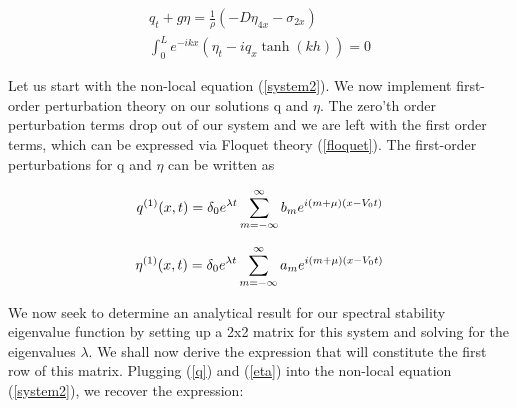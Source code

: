 \documentclass{article}
\begin{document}
\begin{align} \label{system}
q_{t} + g\eta = \frac{1}{\rho}( -D\eta_{4x} - \sigma_{2x} )\\\label{system2}
\int_{0}^{L} e^{-ikx}(\eta_{t} - iq_{x}\tanh(kh)) = 0
\end{align}


Let us start with the non-local equation (\ref{system2}). We now implement first-order perturbation theory on our solutions q and \(\eta\). The zero'th order perturbation terms drop out of our system and we are left with the first order terms, which can be expressed via Floquet theory (\ref{floquet}). The first-order perturbations for q and \(\eta\) can be written as

\begin{equation} \label{q}
  q^{(1)}(x,t) = \delta_{0}e^{\lambda t}\sum_{m=-\infty}^{\infty}b_{m}e^{i(m+\mu)(x-V_{0}t)}
\\
\end{equation}


\begin{equation} \label{eta}
  \eta^{(1)}(x,t) = \delta_{0}e^{\lambda t}\sum_{m=-\infty}^{\infty}a_{m}e^{i(m+\mu)(x-V_{0}t)}
\\
\end{equation}

We now seek to determine an analytical result for our spectral stability eigenvalue function by setting up a 2x2 matrix for this system and solving for the eigenvalues \(\lambda\). We shall now derive the expression that will constitute the first row of this matrix. Plugging (\ref{q}) and (\ref{eta}) into the non-local equation (\ref{system2}), we recover the expression:
\end{document}
